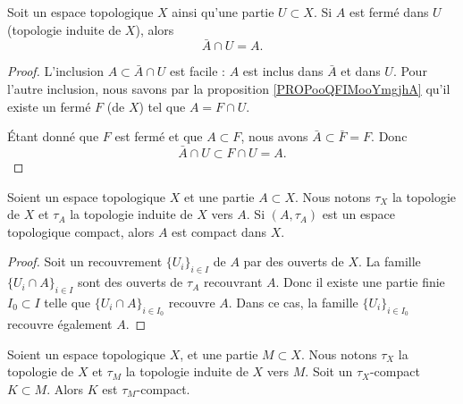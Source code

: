 \begin{proposition}	\label{PROPooPZSRooAZyAEs}
	Soit un espace topologique \( X\) ainsi qu'une partie \( U\subset X\). Si \( A\) est fermé dans \( U\) (topologie induite de \( X\)), alors
	\begin{equation}
		\bar A\cap U=A.
	\end{equation}
\end{proposition}

\begin{proof}
	L'inclusion \( A\subset \bar A\cap U\) est facile : \( A\) est inclus dans \( \bar A\) et dans \( U\). Pour l'autre inclusion, nous savons par la proposition \ref{PROPooQFIMooYmgjhA} qu'il existe un fermé \( F\) (de \( X\)) tel que \( A=F\cap U\).

	Étant donné que \( F\) est fermé et que \( A\subset F\), nous avons \( \bar A\subset \bar F=F\). Donc
	\begin{equation}
		\bar A\cap U\subset F\cap U=A.
	\end{equation}
\end{proof}


\begin{proposition}	\label{PROPooNZTTooTrKoVF}
	Soient un espace topologique \( X\) et une partie \( A\subset X\). Nous notons \( \tau_X\) la topologie de \( X\) et \( \tau_A\) la topologie induite de \( X\) vers \( A\). Si \( (A,\tau_A)\) est un espace topologique compact, alors \( A\) est compact dans \( X\).
\end{proposition}

\begin{proof}
	Soit un recouvrement \( \{ U_i \}_{i\in I}\) de \( A\) par des ouverts de \( X\). La famille \( \{ U_i\cap A \}_{i\in I}\) sont des ouverts de \( \tau_A\) recouvrant \( A\). Donc il existe une partie finie \( I_0\subset I\) telle que \( \{ U_i\cap A \}_{i\in I_0}\) recouvre \( A\). Dans ce cas, la famille \( \{ U_i \}_{i\in I_0}\) recouvre également \( A\).
\end{proof}

\begin{proposition}	\label{PROPooBKPEooQupIUx}
	Soient un espace topologique \( X\), et une partie \( M\subset X\). Nous notons \( \tau_X\) la topologie de \( X\) et \( \tau_M\) la topologie induite de \( X\) vers \( M\). Soit un \( \tau_X\)-compact \( K\subset M\). Alors \( K\) est \( \tau_M\)-compact.
\end{proposition}

